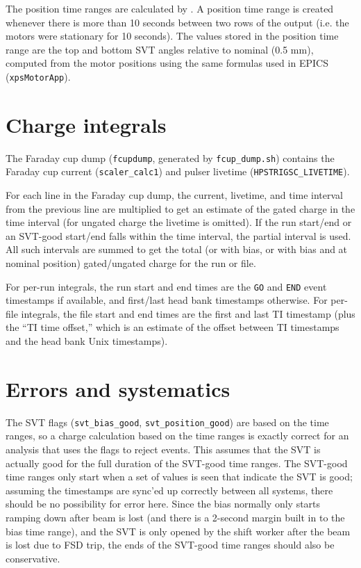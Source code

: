 \documentclass[aps,amsmath,amssymb,notitlepage,11pt,onecolumn]{revtex4-1}
\begin{document}
The position time ranges are calculated by .
A position time range is created whenever there is more than 10 seconds between two rows of the output (i.e. the motors were stationary for 10 seconds).
The values stored in the position time range are the top and bottom SVT angles relative to nominal (0.5 mm), computed from the motor positions using the same formulas used in EPICS (\texttt{xpsMotorApp}).

\section{Charge integrals}
The Faraday cup dump (\texttt{fcupdump}, generated by \texttt{fcup\_dump.sh}) contains the Faraday cup current (\texttt{scaler\_calc1}) and pulser livetime (\texttt{HPSTRIGSC\_LIVETIME}).

For each line in the Faraday cup dump, the current, livetime, and time interval from the previous line are multiplied to get an estimate of the gated charge in the time interval (for ungated charge the livetime is omitted).
If the run start/end or an SVT-good start/end falls within the time interval, the partial interval is used.
All such intervals are summed to get the total (or with bias, or with bias and at nominal position) gated/ungated charge for the run or file.

For per-run integrals, the run start and end times are the \texttt{GO} and \texttt{END} event timestamps if available, and first/last head bank timestamps otherwise.
For per-file integrals, the file start and end times are the first and last TI timestamp (plus the ``TI time offset,'' which is an estimate of the offset between TI timestamps and the head bank Unix timestamps).

\section{Errors and systematics}
The SVT flags (\texttt{svt\_bias\_good}, \texttt{svt\_position\_good}) are based on the time ranges, so a charge calculation based on the time ranges is exactly correct for an analysis that uses the flags to reject events.
This assumes that the SVT is actually good for the full duration of the SVT-good time ranges.
The SVT-good time ranges only start when a set of values is seen that indicate the SVT is good; assuming the timestamps are sync'ed up correctly between all systems, there should be no possibility for error here.
Since the bias normally only starts ramping down after beam is lost (and there is a 2-second margin built in to the bias time range), and the SVT is only opened by the shift worker after the beam is lost due to FSD trip, the ends of the SVT-good time ranges should also be conservative.
\end{document}

